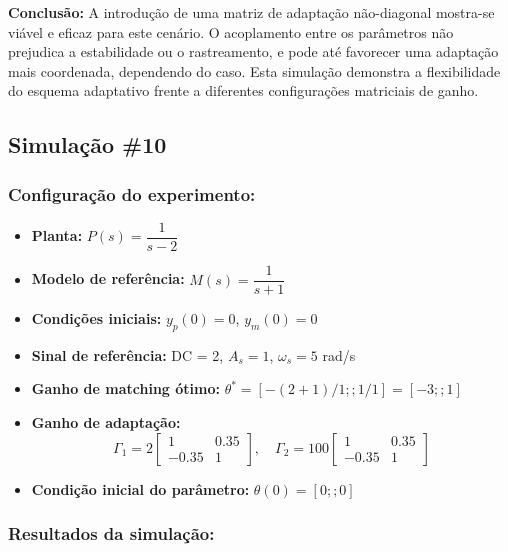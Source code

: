 \documentclass[10pt]{article}
\begin{document}
\textbf{Conclusão:} A introdução de uma matriz de adaptação não-diagonal mostra-se viável e eficaz para este cenário. O acoplamento entre os parâmetros não prejudica a estabilidade ou o rastreamento, e pode até favorecer uma adaptação mais coordenada, dependendo do caso. Esta simulação demonstra a flexibilidade do esquema adaptativo frente a diferentes configurações matriciais de ganho.

\newpage

\subsection{Simulação \#10}
\subsubsection{Configuração do experimento:}
\begin{itemize}
\item \textbf{Planta:} $P(s) = \dfrac{1}{s - 2}$
\item \textbf{Modelo de referência:} $M(s) = \dfrac{1}{s + 1}$
\item \textbf{Condições iniciais:} $y_p(0)=0$, $y_m(0)=0$
\item \textbf{Sinal de referência:} DC = 2, $A_s=1$, $\omega_s=5$ rad/s
\item \textbf{Ganho de matching ótimo:} $\theta^* = [-(2+1)/1;;1/1] = [-3;;1]$
\item \textbf{Ganho de adaptação:} 
\[
\Gamma_1 = 2 \begin{bmatrix} 1 & 0.35 \\ -0.35 & 1 \end{bmatrix}, \quad
\Gamma_2 = 100 \begin{bmatrix} 1 & 0.35 \\ -0.35 & 1 \end{bmatrix}
\]
\item \textbf{Condição inicial do parâmetro:} $\theta(0) = [0;;0]$
\end{itemize}

\subsubsection{Resultados da simulação:}
\end{document}
